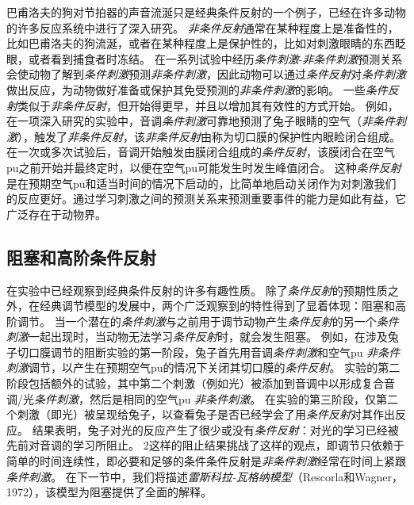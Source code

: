 巴甫洛夫的狗对节拍器的声音流涎只是经典条件反射的一个例子，已经在许多动物的许多反应系统中进行了深入研究。
\textit{非条件反射}通常在某种程度上是准备性的，比如巴甫洛夫的狗流涎，或者在某种程度上是保护性的，比如对刺激眼睛的东西眨眼，或者看到捕食者时冻结。
在一系列试验中经历\textit{条件刺激}-\textit{非条件刺激}预测关系会使动物了解到\textit{条件刺激}预测\textit{非条件刺激}，因此动物可以通过\textit{条件反射}对\textit{条件刺激}做出反应，为动物做好准备或保护其免受预测的\textit{非条件刺激}的影响。
一些\textit{条件反射}类似于\textit{非条件反射}，但开始得更早，并且以增加其有效性的方式开始。
例如，在一项深入研究的实验中，音调\textit{条件刺激}可靠地预测了兔子眼睛的空气（\textit{非条件刺激}），触发了\textit{非条件反射}，该\textit{非条件反射}由称为切口膜的保护性内眼睑闭合组成。
在一次或多次试验后，音调开始触发由膜闭合组成的\textit{条件反射}，该膜闭合在空气pu之前开始并最终定时，以便在空气pu可能发生时发生峰值闭合。
这种\textit{条件反射}是在预期空气pu和适当时间的情况下启动的，比简单地启动关闭作为对刺激我们的反应更好。通过学习刺激之间的预测关系来预测重要事件的能力是如此有益，它广泛存在于动物界。





\subsection{阻塞和高阶条件反射} \label{sec:blocking_higher_order}

在实验中已经观察到经典条件反射的许多有趣性质。
除了\textit{条件反射}的预期性质之外，在经典调节模型的发展中，两个广泛观察到的特性得到了显着体现：阻塞和高阶调节。
当一个潜在的\textit{条件刺激}与之前用于调节动物产生\textit{条件反射}的另一个\textit{条件刺激}一起出现时，当动物无法学习\textit{条件反射}时，就会发生阻塞。
例如，在涉及兔子切口膜调节的阻断实验的第一阶段，兔子首先用音调\textit{条件刺激}和空气pu \textit{非条件刺激}调节，以产生在预期空气pu的情况下关闭其切口膜的\textit{条件反射}。
实验的第二阶段包括额外的试验，其中第二个刺激（例如光）被添加到音调中以形成复合音调/光\textit{条件刺激}，然后是相同的空气pu \textit{非条件刺激}。
在实验的第三阶段，仅第二个刺激（即光）被呈现给兔子，以查看兔子是否已经学会了用\textit{条件反射}对其作出反应。
结果表明，兔子对光的反应产生了很少或没有\textit{条件反射}：对光的学习已经被先前对音调的学习所阻止。
2这样的阻止结果挑战了这样的观点，即调节只依赖于简单的时间连续性，即必要和足够的条件条件反射是\textit{非条件刺激}经常在时间上紧跟\textit{条件刺激}。
在下一节中，我们将描述\textit{雷斯科拉-瓦格纳模型}（Rescorla和Wagner，1972），该模型为阻塞提供了全面的解释。
	


